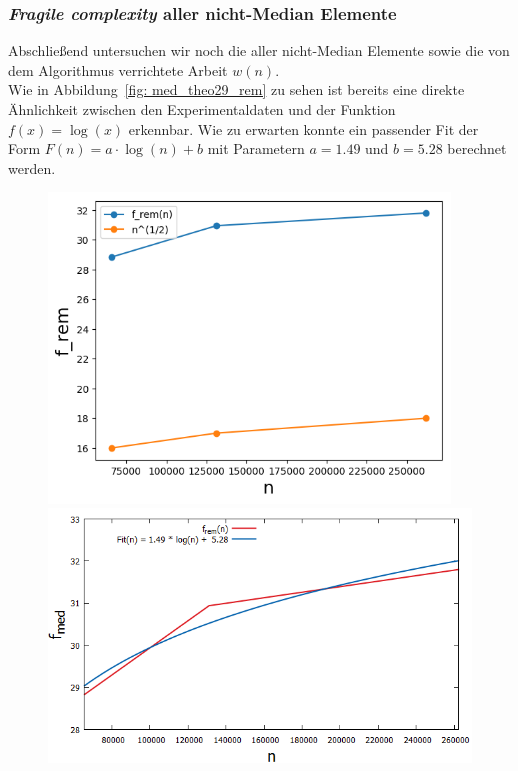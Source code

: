 \subsubsection*{\textit{Fragile complexity} aller nicht-Median Elemente}
Abschließend untersuchen wir noch die \fg aller nicht-Median Elemente \fgr sowie die von dem Algorithmus \RM verrichtete Arbeit $w(n)$.\\[.05cm]
Wie in Abbildung~\ref{fig: med_theo29_rem} zu sehen ist bereits eine direkte Ähnlichkeit zwischen den Experimentaldaten und der Funktion $f(x)=\log(x)$ erkennbar. Wie zu erwarten konnte ein passender Fit der Form $F(n)= a\cdot \log(n) +b$ mit Parametern $a=1.49$ und $b=5.28$ berechnet werden.
\begin{figure}[H]
	\hspace*{-0.9cm}
    \begin{minipage}[t]{.30\textwidth}
        \centering
		\includegraphics[width=0.95\textwidth]{pictures/med_algo_theo29_rem}
    \end{minipage}
    \hspace*{.3cm}
    \begin{minipage}[t]{.30\textwidth}
        \centering
        \includegraphics[width=1.25\textwidth]{pictures/med_algo_theo29_fit_rem}

\end{minipage}
\end{figure}

